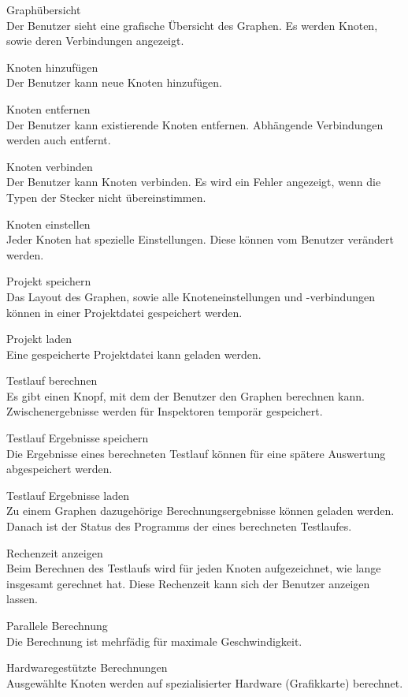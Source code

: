 \begin{speclist}[F]
\setcounter{specnum}{51010}

\spec Graphübersicht \\
Der Benutzer sieht eine grafische Übersicht des Graphen. Es werden Knoten, sowie deren Verbindungen angezeigt.

\spec Knoten hinzufügen \\
Der Benutzer kann neue Knoten hinzufügen.

\spec Knoten entfernen \\
Der Benutzer kann existierende Knoten entfernen. Abhängende Verbindungen werden auch entfernt.

\spec Knoten verbinden \\
Der Benutzer kann Knoten verbinden. Es wird ein Fehler angezeigt, wenn die Typen der Stecker nicht übereinstimmen.

\spec Knoten einstellen \\
Jeder Knoten hat spezielle Einstellungen. Diese können vom Benutzer verändert werden.

\spec Projekt speichern \\
Das Layout des Graphen, sowie alle Knoteneinstellungen und -verbindungen können in einer Projektdatei gespeichert werden.

\spec Projekt laden \\
Eine gespeicherte Projektdatei kann geladen werden.

\spec Testlauf berechnen \\
Es gibt einen Knopf, mit dem der Benutzer den Graphen berechnen kann. Zwischenergebnisse werden für Inspektoren temporär gespeichert.

\spec Testlauf Ergebnisse speichern \\
Die Ergebnisse eines berechneten Testlauf können für eine spätere Auswertung abgespeichert werden.

\spec Testlauf Ergebnisse laden \\
Zu einem Graphen dazugehörige Berechnungsergebnisse können geladen werden. Danach ist der Status des Programms der eines berechneten Testlaufes.

\spec Rechenzeit anzeigen \\
Beim Berechnen des Testlaufs wird für jeden Knoten aufgezeichnet, wie lange insgesamt gerechnet hat. Diese Rechenzeit kann sich der Benutzer anzeigen lassen.

\optspec Parallele Berechnung \\
Die Berechnung ist mehrfädig für maximale Geschwindigkeit.

\optspec Hardwaregestützte Berechnungen \\
Ausgewählte Knoten werden auf spezialisierter Hardware (Grafikkarte) berechnet.

\end{speclist}
